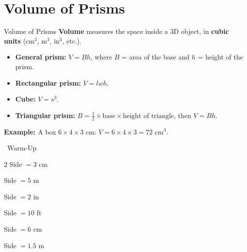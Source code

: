 \section{Volume of Prisms}

\begin{quickReview}{Volume of Prisms}
\textbf{Volume} measures the space inside a 3D object, in \textbf{cubic units} (cm$^3$, m$^3$, in$^3$, etc.).

\begin{itemize}[leftmargin=*]
    \item \textbf{General prism:} $V = Bh$, where $B$ = area of the base and $h$ = height of the prism.
    \item \textbf{Rectangular prism:} $V = lwh$.
    \item \textbf{Cube:} $V = s^3$.
    \item \textbf{Triangular prism:} $B = \frac{1}{2} \times \text{base} \times \text{height of triangle}$, then $V = Bh$.
\end{itemize}

\medskip
\textbf{Example:} A box $6 \times 4 \times 3$ cm: $V = 6 \times 4 \times 3 = 72$ cm$^3$.
\end{quickReview}

\begin{practiceBox}[funGreen]{\faSun~Warm-Up}


\begin{multicols}{2}
\prob Side $= 3$ cm \answerBlank[3cm]

\prob Side $= 5$ m \answerBlank[3cm]

\prob Side $= 2$ in \answerBlank[3cm]

\prob Side $= 10$ ft \answerBlank[3cm]

\prob Side $= 6$ cm \answerBlank[3cm]

\prob Side $= 1.5$ m \answerBlank[3cm]
\end{multicols}
\end{practiceBox}

